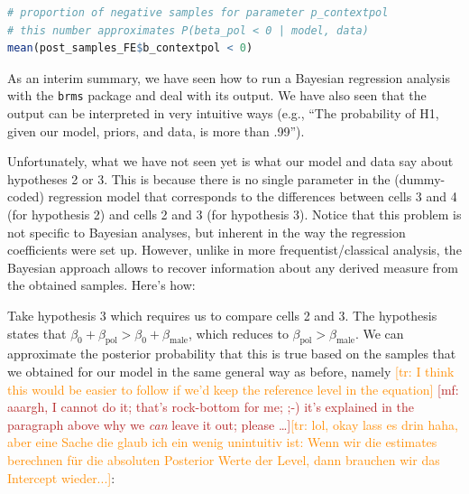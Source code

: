 \documentclass[nobib]{tufte-handout}
\renewcommand{\mf}[1]{\textcolor{firebrick}{[mf: #1]}}
\newcommand{\tr}[1]{\textcolor{DarkOrange}{[tr: #1]}}
\begin{document}
\begin{minipage}[]{\textwidth}
\begin{lstlisting}[language=R]
# proportion of negative samples for parameter p_contextpol
# this number approximates P(beta_pol < 0 | model, data)
mean(post_samples_FE$b_contextpol < 0)
\end{lstlisting}
\end{minipage}

As an interim summary, we have seen how to run a Bayesian regression analysis with the \texttt{brms} package and deal with its output. We have also seen that the output can be interpreted in very intuitive ways (e.g., ``The probability of H1, given our model, priors, and data, is more than .99'').

Unfortunately, what we have not seen yet is what our model and data say about hypotheses 2 or 3. This is because there is no single parameter in the (dummy-coded) regression model that corresponds to the differences between cells 3 and 4 (for hypothesis 2) and cells 2 and 3 (for hypothesis 3). Notice that this problem is not specific to Bayesian analyses, but inherent in the way the regression coefficients were set up.
%
%
However, unlike in more frequentist/classical analysis, the Bayesian approach allows to recover information about any derived measure from the obtained samples. Here's how:

Take hypothesis 3 which requires us to compare cells 2 and 3. The hypothesis states that
$\beta_0 + \beta_{\text{pol}} > \beta_0 + \beta_{\text{male}}$, which reduces to
$\beta_{\text{pol}} > \beta_{\text{male}}$. We can approximate the posterior probability that
this is true based on the samples that we obtained for our model in the same general way as
before, namely \tr{I think this would be easier to follow if we'd keep the reference level in
  the equation} \mf{aaargh, I cannot do it; that's rock-bottom for me; ;-) it's explained in
  the paragraph above why we \emph{can} leave it out; please \dots}\tr{lol, okay lass es drin haha, aber eine Sache die glaub ich ein wenig unintuitiv ist: Wenn wir die estimates berechnen für die absoluten Posterior Werte der Level,  dann brauchen wir das Intercept wieder...}:
\end{document}
